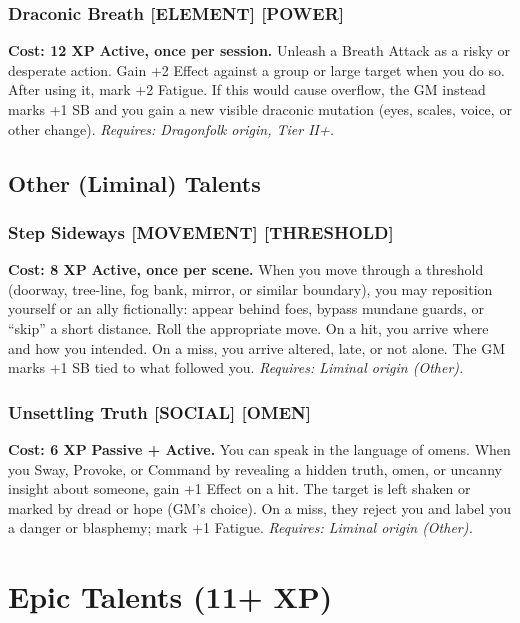 \documentclass[12pt,a4paper]{book}
\begin{document}
\subsubsection*{Draconic Breath \textnormal{[ELEMENT] [POWER]}}
\label{talent:draconic-breath}
\textbf{Cost: 12 XP} \textbf{Active, once per session.} Unleash a Breath Attack as a risky or desperate action. Gain +2 Effect against a group or large target when you do so. After using it, mark +2 Fatigue. If this would cause overflow, the GM instead marks +1 SB and you gain a new visible draconic mutation (eyes, scales, voice, or other change).
\textit{Requires: Dragonfolk origin, Tier II+.}

\subsection*{Other (Liminal) Talents}
\label{sec:prestige-other}

\subsubsection*{Step Sideways \textnormal{[MOVEMENT] [THRESHOLD]}}
\label{talent:step-sideways}
\textbf{Cost: 8 XP} \textbf{Active, once per scene.} When you move through a threshold (doorway, tree-line, fog bank, mirror, or similar boundary), you may reposition yourself or an ally fictionally: appear behind foes, bypass mundane guards, or ``skip'' a short distance. Roll the appropriate move. On a hit, you arrive where and how you intended. On a miss, you arrive altered, late, or not alone. The GM marks +1 SB tied to what followed you.
\textit{Requires: Liminal origin (Other).}

\subsubsection*{Unsettling Truth \textnormal{[SOCIAL] [OMEN]}}
\label{talent:unsettling-truth}
\textbf{Cost: 6 XP} \textbf{Passive + Active.} You can speak in the language of omens. When you Sway, Provoke, or Command by revealing a hidden truth, omen, or uncanny insight about someone, gain +1 Effect on a hit. The target is left shaken or marked by dread or hope (GM's choice). On a miss, they reject you and label you a danger or blasphemy; mark +1 Fatigue.
\textit{Requires: Liminal origin (Other).}

\section{Epic Talents (11+ XP)}
\label{sec:epic-talents}
\end{document}
